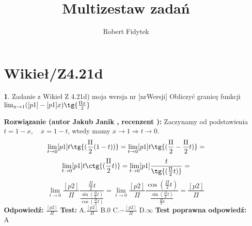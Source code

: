 \documentclass[12pt, a4paper]{article}
\title{Multizestaw zadań}
\author{Robert Fidytek}
\date{}
\theoremstyle{definition} %
\newtheorem{zad}{}
\newcommand{\kategoria}[1]{\section{#1}} %
\newcommand{\zadStart}[1]{\begin{zad}#1\newline} %
\newcommand{\zadStop}{\end{zad}}   %
\newcommand{\rozwStart}[2]{\noindent \textbf{Rozwiązanie (autor #1 , recenzent #2): }\newline} %
\newcommand{\odpStart}{\noindent \textbf{Odpowiedź:}\newline}    %
\newcommand{\odpStop}{\newline}                                             %
\newcommand{\testStart}{\noindent \textbf{Test:}\newline} %
\newcommand{\testStop}{\newline} %
\newcommand{\kluczStart}{\noindent \textbf{Test poprawna odpowiedź:}\newline} %
\newcommand{\kluczStop}{\newline} %
\begin{document}
\maketitle


\kategoria{Wikieł/Z4.21d}
\zadStart{Zadanie z Wikieł Z 4.21d) moja wersja nr [nrWersji]}
Obliczyć granicę funkcji $\lim_{x \to 1} ([p1]-[p1]x)\tg{\frac{\Pi x}{2}}$
\zadStop
\rozwStart{Jakub Janik}{}
Zaczynamy od podstawienia $t=1-x, \quad x=1-t$, wtedy mamy $x \to 1 \Rightarrow t \to 0$.
$$\lim_{t \to 0} [p1]t\tg{(\frac{\Pi}{2}(1-t))}=\lim_{t \to 0} [p1]t\tg{(\frac{\Pi}{2}-\frac{\Pi}{2}t)}=$$
$$\lim_{t \to 0} [p1]t\ctg{(\frac{\Pi}{2}t)}=\lim_{t \to 0} [p1]\frac{t}{\tg{(\frac{\Pi}{2}t)}}=$$
$$\lim_{t \to 0} \frac{[p2]}{\Pi}\frac{\frac{\Pi}{2}t}{\frac{\sin{(\frac{\Pi}{2}t)}}{\cos{(\frac{\Pi}{2}t)}}}=\lim_{t \to 0} \frac{[p2]}{\Pi}\frac{\cos{(\frac{\Pi}{2}t)}}{\frac{\sin{(\frac{\Pi}{2}t)}}{\frac{\Pi}{2}t}}=\frac{[p2]}{\Pi}$$
\odpStart
$\frac{[p2]}{\Pi}$
\odpStop
\testStart
A.$\frac{[p2]}{\Pi}$
B.$0$
C.$-\frac{[p2]}{\Pi}$
D.$\infty$
\testStop
\kluczStart
A
\kluczStop
\end{document}
